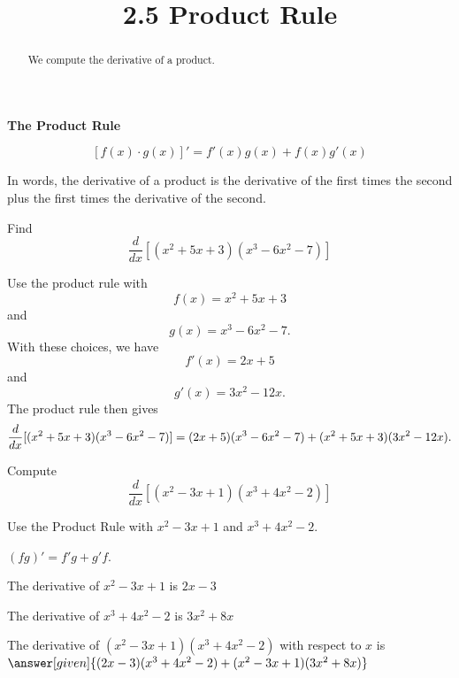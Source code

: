 \documentclass{ximera}
\title{2.5 Product Rule}
\begin{document}
\begin{abstract}
We compute the derivative of a product.
\end{abstract}

\maketitle


\begin{center}
\bf{The Product Rule}
\end{center}


\[[f(x) \cdot g(x)]' = f'(x)g(x) + f(x)g'(x)\]

In words, the derivative of a product is the derivative of the first times the second plus the first 
times the derivative of the second.\\

\begin{example}
Find 
\[
\frac{d}{dx} [(x^2 + 5x+3)(x^3 - 6x^2 -7)]
\]

Use the product rule with 
\[
f(x) = x^2 + 5x+3
\]
and
\[
g(x) = x^3 -6x^2 -7.
\]
With these choices, we have
\[
f'(x) = 2x + 5
\]
and 
\[
g'(x) = 3x^2 - 12x.
\]
The product rule then gives
\[
\frac{d}{dx} [(x^2 + 5x+3)(x^3 - 6x^2 -7)]\\
=(2x+5)(x^3-6x^2 -7) + (x^2 + 5x+3)(3x^2 -12x).
\]
\end{example}


\begin{problem} %
  Compute
  \[
  \frac{d}{dx}[(x^2 - 3x +1)(x^3 + 4x^2 -2)]
  \]
  
    \begin{hint}
      Use the Product Rule with $x^2 -3x+1$ and $x^3 +4x^2-2$.
    \end{hint}
    \begin{hint}
      $(fg)' = f'g+g'f$.
    \end{hint}
    \begin{hint}
      The derivative of $x^2 -3x+1$ is $2x-3$
    \end{hint}
    \begin{hint}
      The derivative of $x^3 + 4x^2 -2$ is $3x^2 +8x$
    \end{hint}
    
		The derivative of $(x^2 - 3x +1)(x^3 + 4x^2 -2)$ with respect to $x$ is
		 $\answer[given]{(2x-3)(x^3+4x^2-2)+(x^2-3x+1)(3x^2+8x)}$
		
\end{problem}
\end{document}
